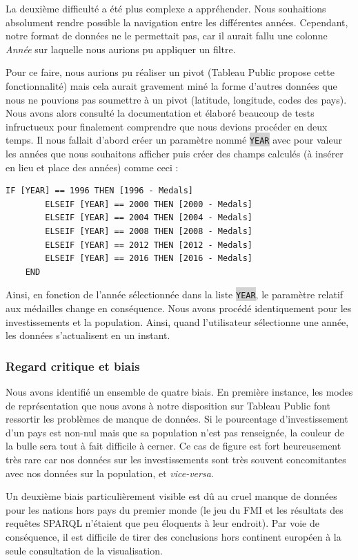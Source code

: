 \documentclass[hidelinks, 12pt]{report}
\newcommand{\code}[1]{\colorbox{LightGray}{\texttt{#1}}}
\begin{document}
La deuxième difficulté a été plus complexe a appréhender. Nous souhaitions absolument rendre possible la navigation entre les différentes années. Cependant, notre format de données ne le permettait pas, car il aurait fallu une colonne \textit{Année} sur laquelle nous aurions pu appliquer un filtre.

Pour ce faire, nous aurions pu réaliser un pivot (Tableau Public propose cette fonctionnalité) mais cela aurait gravement miné la forme d'autres données que nous ne pouvions pas soumettre à un pivot (latitude, longitude, codes des pays). Nous avons alors consulté la documentation et élaboré beaucoup de tests infructueux pour finalement comprendre que nous devions procéder en deux temps. Il nous fallait d'abord créer un paramètre nommé \code{YEAR} avec pour valeur les années que nous souhaitons afficher puis créer des champs calculés (à insérer en lieu et place des années) comme ceci :

\begin{lstlisting}[language=tableau]
	IF [YEAR] == 1996 THEN [1996 - Medals]
		ELSEIF [YEAR] == 2000 THEN [2000 - Medals]
		ELSEIF [YEAR] == 2004 THEN [2004 - Medals]
		ELSEIF [YEAR] == 2008 THEN [2008 - Medals]
		ELSEIF [YEAR] == 2012 THEN [2012 - Medals]
		ELSEIF [YEAR] == 2016 THEN [2016 - Medals]
	END
\end{lstlisting}

Ainsi, en fonction de l'année sélectionnée dans la liste \code{YEAR}, le paramètre relatif aux médailles change en conséquence. Nous avons procédé identiquement pour les investissements et la population. Ainsi, quand l'utilisateur sélectionne une année, les données s'actualisent en un instant.

\subsubsection{Regard critique et biais}

Nous avons identifié un ensemble de quatre biais. En première instance, les modes de représentation que nous avons à notre disposition sur Tableau Public font ressortir les problèmes de manque de données. Si le pourcentage d'investissement d'un pays est non-nul mais que sa population n'est pas renseignée, la couleur de la bulle sera tout à fait difficile à cerner. Ce cas de figure est fort heureusement très rare car nos données sur les investissements sont très souvent concomitantes avec nos données sur la population, et \textit{vice-versa}.

Un deuxième biais particulièrement visible est dû au cruel manque de données pour les nations hors pays du premier monde (le jeu du FMI et les résultats des requêtes SPARQL n'étaient que peu éloquents à leur endroit). Par voie de conséquence, il est difficile de tirer des conclusions hors continent européen à la seule consultation de la visualisation.
\end{document}
